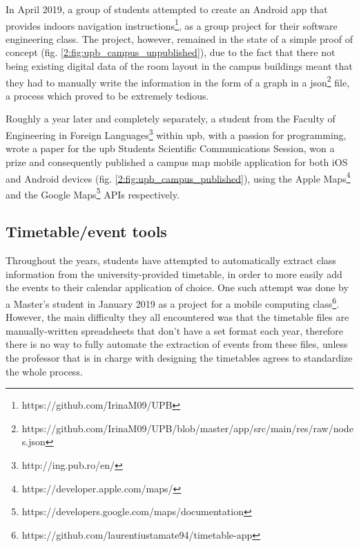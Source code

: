     \clearpage
    
    In April 2019, a group of students attempted to create an Android app that provides indoors navigation instructions\footnote{https://github.com/IrinaM09/UPB}, as a group project for their software engineering class. The project, however, remained in the state of a simple proof of concept (fig. \ref{2:fig:upb_campus_unpublished}), due to the fact that there not being existing digital data of the room layout in the campus buildings meant that they had to manually write the information in the form of a graph in a \gls{json}\footnote{https://github.com/IrinaM09/UPB/blob/master/app/src/main/res/raw/nodes.json} file, a process which proved to be extremely tedious.
    
    Roughly a year later and completely separately, a student from the Faculty of Engineering in Foreign Languages\footnote{http://ing.pub.ro/en/} within \acrshort{upb}, with a passion for programming,  wrote a paper for the \acrshort{upb} Students Scientific Communications Session, won a prize and consequently published a campus map mobile application for both iOS and Android devices (fig. \ref{2:fig:upb_campus_published}), using the Apple Maps\footnote{https://developer.apple.com/maps/} and the Google Maps\footnote{https://developers.google.com/maps/documentation} APIs respectively.
    
    \subsection{Timetable/event tools} \label{2:existing_apps_timetable}
    Throughout the years, students have attempted to automatically extract class information from the university-provided timetable, in order to more easily add the events to their calendar application of choice. One such attempt was done by a Master's student in January 2019 as a project for a mobile computing class\footnote{https://github.com/laurentiustamate94/timetable-app}. However, the main difficulty they all encountered was that the timetable files are manually-written spreadsheets that don't have a set format each year, therefore there is no way to fully automate the extraction of events from these files, unless the professor that is in charge with designing the timetables agrees to standardize the whole process.
    

